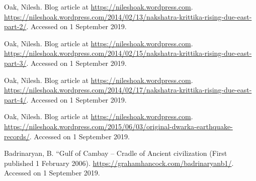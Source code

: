 \begin{thebibliography}{99}
  Oak, Nilesh. Blog article at \url{ https://nileshoak.wordpress.com}. \url{https://nileshoak.wordpress.com/2014/02/13/nakshatra-krittika-rising-due-east-part-2/}. Accessed on 1 September 2019.

  Oak, Nilesh. Blog article at \url{https://nileshoak.wordpress.com}. \url{https://nileshoak.wordpress.com/2014/02/15/nakshatra-krittika-rising-due-east-part-3/}. Accessed on 1 September 2019.

  Oak, Nilesh. Blog article at \url{https://nileshoak.wordpress.com}. \url{https://nileshoak.wordpress.com/2014/02/17/nakshatra-krittika-rising-due-east-part-4/}. Accessed on 1 September 2019.

  Oak, Nilesh. Blog article at \url{https://nileshoak.wordpress.com}. \url{https://nileshoak.wordpress.com/2015/06/03/original-dwarka-earthquake-records/}. Accessed on 1 September 2019.

  Badrinaryan, B. “Gulf of Cambay – Cradle of Ancient civilization (First published 1 February 2006). \url{https://grahamhancock.com/badrinaryanb1/}. Accessed on 1 September 2019.

 \end{thebibliography}

